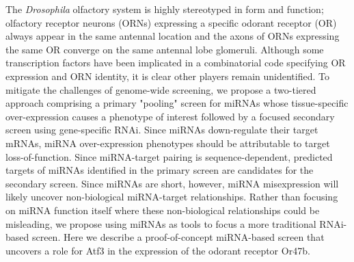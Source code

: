 The \emph{Drosophila} olfactory system is highly stereotyped in form and function; olfactory receptor neurons (ORNs) expressing a specific odorant receptor (OR) always appear in the same antennal location and the axons of ORNs expressing the same OR converge on the same antennal lobe glomeruli. Although some transcription factors have been implicated in a combinatorial code specifying OR expression and ORN identity, it is clear other players remain unidentified. To mitigate the challenges of genome-wide screening, we propose a two-tiered approach comprising a primary "pooling" screen for miRNAs whose tissue-specific over-expression causes a phenotype of interest followed by a focused secondary screen using gene-specific RNAi. Since miRNAs down-regulate their target mRNAs, miRNA over-expression phenotypes should be attributable to target loss-of-function. Since miRNA-target pairing is sequence-dependent, predicted targets of miRNAs identified in the primary screen are candidates for the secondary screen. Since miRNAs are short, however, miRNA misexpression will likely uncover non-biological miRNA-target relationships. Rather than focusing on miRNA function itself where these non-biological relationships could be misleading, we propose using miRNAs as tools to focus a more traditional RNAi-based screen. Here we describe a proof-of-concept miRNA-based screen that uncovers a role for Atf3 in the expression of the odorant receptor Or47b.